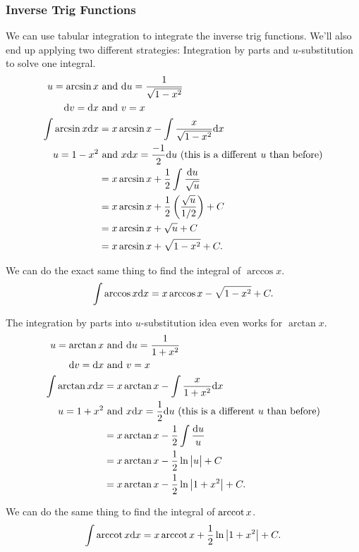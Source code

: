 \subsubsection{Inverse Trig Functions}
We can use tabular integration to integrate the inverse trig functions.
We'll also end up applying two different strategies: Integration by parts and $u$-substitution to solve one integral.
\begin{align*}
	u = \arcsin{x} &\text{ and } \mathrm{d} u = \frac{1}{\sqrt{1-x^2}} \\
	\mathrm{d} v = \mathrm{d} x &\text{ and } v = x \\
	\int{\arcsin{x}\mathrm{d} x} &= x\arcsin{x} - \int{\frac{x}{\sqrt{1-x^2}}\mathrm{d} x} \\
	u = 1-x^2 &\text{ and } x\mathrm{d} x = \frac{-1}{2}\mathrm{d} u \text{ (this is a different $u$ than before)} \\
	&= x\arcsin{x} + \frac{1}{2}\int{\frac{\mathrm{d} u}{\sqrt{u}}} \\
	&= x\arcsin{x} + \frac{1}{2}\left(\frac{\sqrt{u}}{1/2}\right) + C \\
	&= x\arcsin{x} + \sqrt{u} + C \\
	&= x\arcsin{x} + \sqrt{1-x^2} + C.
\end{align*}

We can do the exact same thing to find the integral of $\arccos{x}$.
\begin{equation*}
	\int{\arccos{x}\mathrm{d} x} = x\arccos{x} - \sqrt{1-x^2} + C.
\end{equation*}


The integration by parts into $u$-substitution idea even works for $\arctan{x}$.
\begin{align*}
	u = \arctan{x} &\text{ and } \mathrm{d} u = \frac{1}{1+x^2} \\
	\mathrm{d} v = \mathrm{d} x &\text{ and } v = x \\
	\int{\arctan{x}\mathrm{d} x} &= x\arctan{x} - \int{\frac{x}{1+x^2}\mathrm{d} x} \\
	u = 1+x^2 &\text{ and } x\mathrm{d} x = \frac{1}{2}\mathrm{d} u \text{ (this is a different $u$ than before)} \\
	&= x\arctan{x} - \frac{1}{2}\int{\frac{\mathrm{d} u}{u}} \\
	&= x\arctan{x} - \frac{1}{2}\ln{\big\lvert u \big\rvert} + C \\
	&= x\arctan{x} - \frac{1}{2}\ln{\big\lvert 1+x^2 \big\rvert} + C.
\end{align*}

We can do the same thing to find the integral of $\operatorname{arccot}{x}$.
\begin{equation*}
	\int{\operatorname{arccot}{x}\mathrm{d} x} = x\operatorname{arccot}{x} + \frac{1}{2}\ln{\big\lvert 1+x^2 \big\rvert} + C.
\end{equation*}


